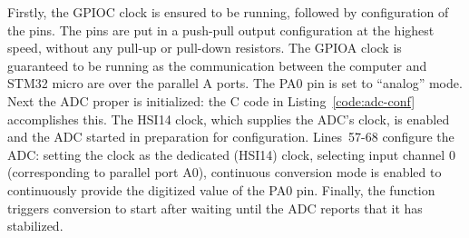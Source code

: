 Firstly, the GPIOC clock is ensured to be running, followed by
configuration of the pins. The pins are put in a push-pull output
configuration at the highest speed, without any pull-up or pull-down
resistors. The GPIOA clock is guaranteed to be running as the
communication between the computer and STM32 micro are over the parallel
A ports. The PA0 pin is set to ``analog'' mode. \\



Next the ADC proper is initialized: the C code in
Listing~\ref{code:adc-conf} accomplishes this.  The HSI14 clock, which
supplies the ADC's clock, is enabled and the ADC started in preparation
for configuration. Lines~57-68 configure the ADC: setting the clock as
the dedicated (HSI14) clock, selecting input channel 0 (corresponding to
parallel port A0), continuous conversion mode is enabled to continuously
provide the digitized value of the PA0 pin. Finally, the function
triggers conversion to start after waiting until the ADC reports that it
has stabilized.
